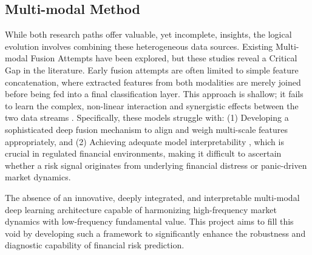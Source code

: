 \subsection{Multi-modal Method}
While both research paths offer valuable, yet incomplete, insights, the logical evolution involves combining these heterogeneous data sources. Existing Multi-modal Fusion Attempts have been explored, but these studies reveal a Critical Gap in the literature. Early fusion attempts are often limited to simple feature concatenation, where extracted features from both modalities are merely joined before being fed into a final classification layer. This approach is shallow; it fails to learn the complex, non-linear interaction and synergistic effects between the two data streams . Specifically, these models struggle with: (1) Developing a sophisticated deep fusion mechanism to align and weigh multi-scale features appropriately, and (2) Achieving adequate model interpretability , which is crucial in regulated financial environments, making it difficult to ascertain whether a risk signal originates from underlying financial distress or panic-driven market dynamics.

The absence of an innovative, deeply integrated, and interpretable multi-modal deep learning architecture capable of harmonizing high-frequency market dynamics with low-frequency fundamental value. This project aims to fill this void by developing such a framework to significantly enhance the robustness and diagnostic capability of financial risk prediction.